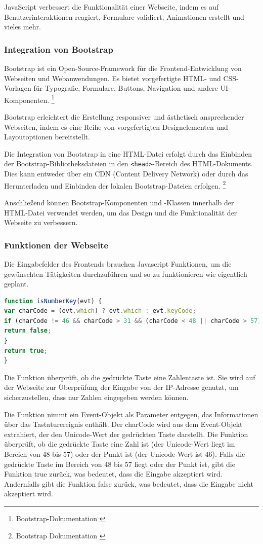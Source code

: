 \begin{itemize}
JavaScript verbessert die Funktionalität einer Webseite, indem es auf Benutzerinteraktionen reagiert, Formulare validiert, Animationen erstellt und vieles mehr.

\subsubsection*{Integration von Bootstrap}
Bootstrap ist ein Open-Source-Framework für die Frontend-Entwicklung von Webseiten und Webanwendungen. Es bietet vorgefertigte HTML- und CSS-Vorlagen für Typografie, Formulare, Buttons, Navigation und andere UI-Komponenten. \footnote{Bootstrap-Dokumentation \cite{Bootstrap}}

Bootstrap erleichtert die Erstellung responsiver und ästhetisch ansprechender Webseiten, indem es eine Reihe von vorgefertigten Designelementen und Layoutoptionen bereitstellt.

Die Integration von Bootstrap in eine HTML-Datei erfolgt durch das Einbinden der Bootstrap-Bibliotheksdateien in den \texttt{<head>}-Bereich des HTML-Dokuments. Dies kann entweder über ein CDN (Content Delivery Network) oder durch das Herunterladen und Einbinden der lokalen Bootstrap-Dateien erfolgen. \footnote{Bootstrap Dokumentation \cite{CDN-Links}}

Anschließend können Bootstrap-Komponenten und -Klassen innerhalb der HTML-Datei verwendet werden, um das Design und die Funktionalität der Webseite zu verbessern.

\subsubsection{Funktionen der Webseite}
Die Eingabefelder des Frontends brauchen Javascript Funktionen, um die gewünschten Tätigkeiten durchzuführen und so zu funktionieren wie eigentlich geplant.
\begin{lstlisting}[language=JavaScript, caption={Javascript | Ueberpruefung, ob die Eingabe eine Zahl oder . ist}]
function isNumberKey(evt) {
var charCode = (evt.which) ? evt.which : evt.keyCode;
if (charCode != 46 && charCode > 31 && (charCode < 48 || charCode > 57)) {
return false;
}
return true;
}
\end{lstlisting}
Die Funktion überprüft, ob die gedrückte Taste eine Zahlentaste ist. Sie wird auf der Webseite zur Überprüfung der Eingabe von der IP-Adresse genutzt, um sicherzustellen, dass nur Zahlen eingegeben werden können.

Die Funktion nimmt ein Event-Objekt als Parameter entgegen, das Informationen über das Tastaturereignis enthält. Der charCode wird aus dem Event-Objekt extrahiert, der den Unicode-Wert der gedrückten Taste darstellt. Die Funktion überprüft, ob die gedrückte Taste eine Zahl ist (der Unicode-Wert liegt im Bereich von 48 bis 57) oder der Punkt ist (der Unicode-Wert ist 46). Falls die gedrückte Taste im Bereich von 48 bis 57 liegt oder der Punkt ist, gibt die Funktion true zurück, was bedeutet, dass die Eingabe akzeptiert wird. Andernfalls gibt die Funktion false zurück, was bedeutet, dass die Eingabe nicht akzeptiert wird.


\end{itemize}
